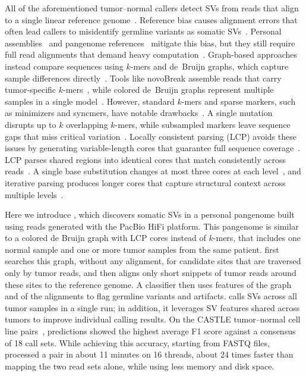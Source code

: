 All of the aforementioned tumor--normal callers detect SVs from reads that align to a single linear reference genome~\cite{Qin_2025}. 
Reference bias causes alignment errors that often lead callers to misidentify germline variants as somatic SVs~\cite{Ballouz_2019,Qin_2025,refbias}. 
Personal assemblies~\cite{hifiasm} and pangenome references~\cite{Liao_2023,Garrison_2018} mitigate this bias, but they still require full read alignments that demand heavy computation~\cite{Alser_2020,Qin_2025,refbias}. 
Graph-based approaches instead compare sequences using $k$-mers and de~Bruijn graphs, which capture sample differences directly~\cite{Pevzner_2001,debruijn,cortex}. 
Tools like novoBreak assemble reads that carry tumor-specific $k$-mers~\cite{novobreak}, while colored de~Bruijn graphs represent multiple samples in a single model~\cite{cortex}. 
However, standard $k$-mers and sparse markers, such as minimizers and syncmers, have notable drawbacks~\cite{roberts,syncmers}. 
A single mutation disrupts up to $k$ overlapping $k$-mers, while subsampled markers leave sequence gaps that miss critical variation~\cite{roberts,syncmers,lcpan}. 
Locally consistent parsing (LCP) avoids these issues by generating variable-length cores that guarantee full sequence coverage~\cite{sv94a,sv94b}. 
LCP parses shared regions into identical cores that match consistently across reads~\cite{lcpan,gencore}. 
A single base substitution changes at most three cores at each level~\cite{gencore}, and iterative parsing produces longer cores that capture structural context across multiple levels~\cite{lcpan}.


Here we introduce \tool, which discovers somatic SVs in a personal pangenome built using reads generated with the PacBio HiFi platform.
This pangenome is similar to a colored de Bruijn graph with LCP cores instead of $k$-mers, that includes one normal sample and one or more tumor samples from the same patient.
\tool first searches this graph, without any alignment, for candidate sites that are traversed only by tumor reads, and then aligns only short snippets of tumor reads around these sites to the reference genome.
A classifier then uses features of the graph and of the alignments to flag germline variants and artifacts.
\tool calls SVs across all tumor samples in a single run; in addition, it leverages SV features shared across tumors to improve individual calling results.
On the CASTLE tumor--normal cell line pairs~\cite{severus,deepsomatic}, \tool predictions showed the highest average F1 score against a consensus of 18 call sets.
While achieving this accuracy, starting from FASTQ files, \tool processed a pair in about 11 minutes on 16 threads, about 24 times faster than mapping the two read sets alone, while using less memory and disk space. 

